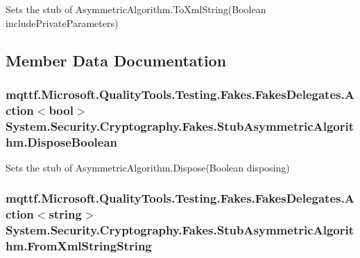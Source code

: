 Sets the stub of Asymmetric\-Algorithm.\-To\-Xml\-String(\-Boolean include\-Private\-Parameters)



\subsection{Member Data Documentation}
\hypertarget{class_system_1_1_security_1_1_cryptography_1_1_fakes_1_1_stub_asymmetric_algorithm_a93df443ec4ef8fbbc37e56cf7587bb37}{
\subsubsection[{Dispose\-Boolean}]{\setlength{\rightskip}{0pt plus 5cm}mqttf.\-Microsoft.\-Quality\-Tools.\-Testing.\-Fakes.\-Fakes\-Delegates.\-Action$<$bool$>$ System.\-Security.\-Cryptography.\-Fakes.\-Stub\-Asymmetric\-Algorithm.\-Dispose\-Boolean}}\label{class_system_1_1_security_1_1_cryptography_1_1_fakes_1_1_stub_asymmetric_algorithm_a93df443ec4ef8fbbc37e56cf7587bb37}


Sets the stub of Asymmetric\-Algorithm.\-Dispose(\-Boolean disposing)

\hypertarget{class_system_1_1_security_1_1_cryptography_1_1_fakes_1_1_stub_asymmetric_algorithm_a242733167ef69ad81660273c153d9f6b}{
\subsubsection[{From\-Xml\-String\-String}]{\setlength{\rightskip}{0pt plus 5cm}mqttf.\-Microsoft.\-Quality\-Tools.\-Testing.\-Fakes.\-Fakes\-Delegates.\-Action$<$string$>$ System.\-Security.\-Cryptography.\-Fakes.\-Stub\-Asymmetric\-Algorithm.\-From\-Xml\-String\-String}}\label{class_system_1_1_security_1_1_cryptography_1_1_fakes_1_1_stub_asymmetric_algorithm_a242733167ef69ad81660273c153d9f6b}


